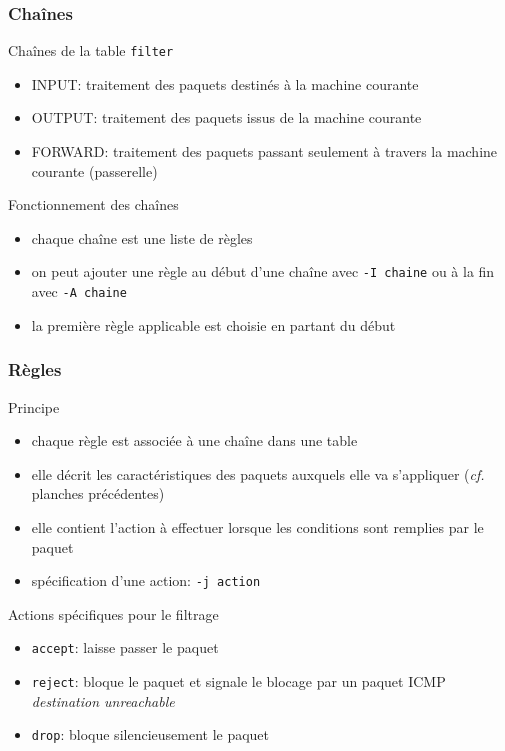 \begin{reveals}
\begin{frame}
  \frametitle{Chaînes}

  \vfill
  \begin{block}{Chaînes de la table \texttt{filter}}
    \begin{itemize}
    \item INPUT: traitement des paquets destinés à la machine courante
    \item OUTPUT: traitement des paquets issus de la machine courante
    \item FORWARD: traitement des paquets passant seulement à travers
      la machine courante (passerelle)
    \end{itemize}
  \end{block}
  \vfill
  \begin{block}{Fonctionnement des chaînes}
    \begin{itemize}
    \item chaque chaîne est une liste de règles
    \item on peut ajouter une règle au début d'une chaîne avec \texttt{-I chaine}
      ou à la fin avec \texttt{-A chaine}
    \item la première règle applicable est choisie en partant du début
    \end{itemize}
  \end{block}
  \vfill
\end{frame}


\begin{frame}
  \frametitle{Règles}
  \vfill

  \begin{block}{Principe}
    \begin{itemize}
    \item chaque règle est associée à une chaîne dans une table 
    \item elle décrit les caractéristiques des paquets auxquels elle
      va s'appliquer (\textit{cf.} planches précédentes)
    \item elle contient l'action à effectuer lorsque les conditions
      sont remplies par le paquet
    \item spécification d'une action:  \texttt{-j action}
    \end{itemize}
  \end{block}
  \vfill
  \begin{block}{Actions spécifiques pour le filtrage}
    \begin{itemize}
    \item \texttt{accept}: laisse passer le paquet
    \item \texttt{reject}: bloque le paquet et signale le blocage par
      un paquet ICMP \emph{destination unreachable}
    \item \texttt{drop}: bloque silencieusement le paquet
    \end{itemize}
  \end{block}
  \vfill
\end{frame}


\end{reveals}
